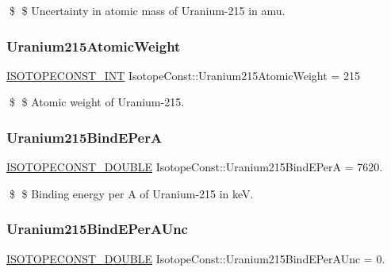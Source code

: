 \$ \$ Uncertainty in atomic mass of Uranium-\/215 in amu. \mbox{\label{group___isotope_const-_uranium-_u215_ga98cf1dead6606f5f448a1964975d4b2b}} 
\subsubsection{\texorpdfstring{Uranium215\+Atomic\+Weight}{Uranium215AtomicWeight}}
{\footnotesize\ttfamily \mbox{\hyperlink{group___isotope_const-_macros_ga5f18360b3e99483a35c32d789e62621c}{I\+S\+O\+T\+O\+P\+E\+C\+O\+N\+S\+T\+\_\+\+I\+NT}} Isotope\+Const\+::\+Uranium215\+Atomic\+Weight = 215}

\$ \$ Atomic weight of Uranium-\/215. \mbox{\label{group___isotope_const-_uranium-_u215_ga5fe9482c2e828285f4fde998b9c6ed6f}} 
\subsubsection{\texorpdfstring{Uranium215\+Bind\+E\+PerA}{Uranium215BindEPerA}}
{\footnotesize\ttfamily \mbox{\hyperlink{group___isotope_const-_macros_ga8f45a7272ce02c0b4c65c44636ed719a}{I\+S\+O\+T\+O\+P\+E\+C\+O\+N\+S\+T\+\_\+\+D\+O\+U\+B\+LE}} Isotope\+Const\+::\+Uranium215\+Bind\+E\+PerA = 7620.}

\$ \$ Binding energy per A of Uranium-\/215 in keV. \mbox{\label{group___isotope_const-_uranium-_u215_gab83f2f4a9ec2dba64aee0ac964f45c5f}} 
\subsubsection{\texorpdfstring{Uranium215\+Bind\+E\+Per\+A\+Unc}{Uranium215BindEPerAUnc}}
{\footnotesize\ttfamily \mbox{\hyperlink{group___isotope_const-_macros_ga8f45a7272ce02c0b4c65c44636ed719a}{I\+S\+O\+T\+O\+P\+E\+C\+O\+N\+S\+T\+\_\+\+D\+O\+U\+B\+LE}} Isotope\+Const\+::\+Uranium215\+Bind\+E\+Per\+A\+Unc = 0.}

